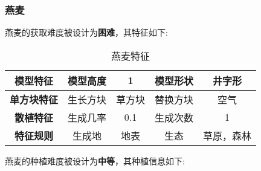 \subsubsection{燕麦}

燕麦的获取难度被设计为\textbf{困难}，其特征如下:
\begin{table}[H]
    \centering
    \caption{燕麦特征}
    \label{table:燕麦特征}
    \setlength{\tabcolsep}{4mm}
    \begin{tabular}{c|cc|cc}
        \toprule
        \textbf{模型特征}                  & 模型高度 & 1      & 模型形状 & 井字形 \\
        \midrule
        \textbf{单方块特征}                & 生长方块 & 草方块 & 替换方块 & 空气   \\
        \midrule
        \textbf{散植特征}                  & 生成几率 & 0.1    & 生成次数 & 1      \\
        \midrule
        \multirow{1}{*}{\textbf{特征规则}} & 生成地   & 地表   & 生态     & 草原，森林   \\
        \bottomrule
    \end{tabular}
\end{table}


燕麦的种植难度被设计为\textbf{中等}，其种植信息如下:

